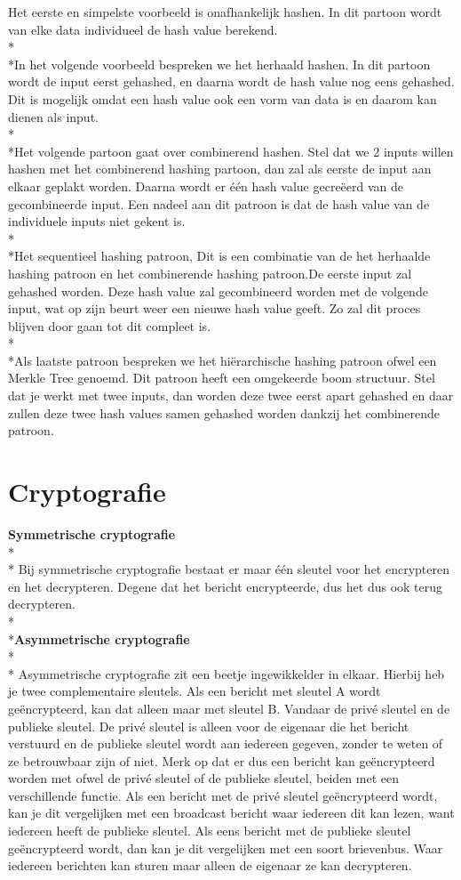 \documentclass[fleqn,a4paper,12pt]{book}
\begin{document}
Het eerste en simpelste voorbeeld is onafhankelijk hashen. In dit partoon wordt van elke data individueel de hash value berekend.\\*\\*In het volgende voorbeeld bespreken we het herhaald hashen. In dit partoon wordt de input eerst gehashed, en daarna wordt de hash value nog eens gehashed. Dit is mogelijk omdat een hash value ook een vorm van data is en daarom kan dienen als input.\\*\\*Het volgende partoon gaat over combinerend hashen. Stel dat we 2 inputs willen hashen met het combinerend hashing partoon, dan zal als eerste de input aan elkaar geplakt worden. Daarna wordt er één hash value gecreëerd van de gecombineerde input. Een nadeel aan dit patroon is dat de hash value van de individuele inputs niet gekent is.\\*\\*Het sequentieel hashing patroon, Dit is een combinatie van de het herhaalde hashing patroon en het combinerende hashing patroon.De eerste input zal gehashed worden. Deze hash value zal gecombineerd worden met de volgende input, wat op zijn beurt weer een nieuwe hash value geeft. Zo zal dit proces blijven door gaan tot dit compleet is.\\*\\*Als laatste patroon bespreken we het hiërarchische hashing patroon ofwel een Merkle Tree genoemd. Dit patroon heeft een omgekeerde boom structuur. Stel dat je werkt met twee inputs, dan worden deze twee eerst apart gehashed en daar zullen deze twee hash values samen gehashed worden dankzij het combinerende patroon.
\section{Cryptografie}
\textbf{Symmetrische cryptografie}\\*\\*
Bij symmetrische cryptografie bestaat er maar één sleutel voor het encrypteren en het decrypteren. Degene dat het bericht encrypteerde, dus het dus ook terug decrypteren. 
\\*\\*\textbf{Asymmetrische cryptografie}\\*\\*
Asymmetrische cryptografie zit een beetje ingewikkelder in elkaar. Hierbij heb je twee complementaire sleutels. Als een bericht met sleutel A wordt geëncrypteerd, kan dat alleen maar met sleutel B. Vandaar de privé sleutel en de publieke sleutel. De privé sleutel is alleen voor de eigenaar die het bericht verstuurd en de publieke sleutel wordt aan iedereen gegeven, zonder te weten of ze betrouwbaar zijn of niet. Merk op dat er dus een bericht kan geëncrypteerd worden met ofwel de privé sleutel of de publieke sleutel, beiden met een verschillende functie. Als een bericht met de privé sleutel geëncrypteerd wordt, kan je dit vergelijken met een broadcast bericht waar iedereen dit kan lezen, want iedereen heeft de publieke sleutel. Als eens bericht met de publieke sleutel geëncrypteerd wordt, dan kan je dit vergelijken met een soort brievenbus. Waar iedereen berichten kan sturen maar alleen de eigenaar ze kan decrypteren.
\end{document}
